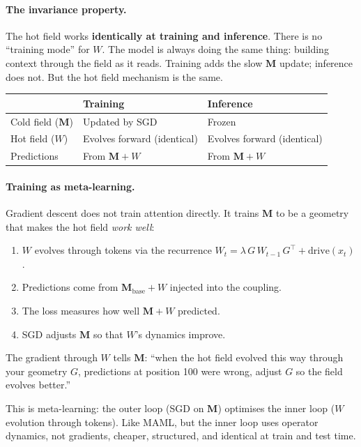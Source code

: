 \documentclass[11pt, a4paper]{article}
\newcommand{\M}{\mathbf{M}}
\theoremstyle{plain}
\theoremstyle{definition}
\theoremstyle{remark}
\begin{document}
\paragraph{The invariance property.}
The hot field works \textbf{identically at training and inference}.
There is no ``training mode'' for $W$.
The model is always doing the same thing: building context through the field as it reads.
Training adds the slow $\M$ update; inference does not.
But the hot field mechanism is the same.

\begin{center}\small
\begin{tabular}{lll}
\toprule
& \textbf{Training} & \textbf{Inference} \\
\midrule
Cold field ($\M$) & Updated by SGD & Frozen \\
Hot field ($W$) & Evolves forward (identical) & Evolves forward (identical) \\
Predictions & From $\M + W$ & From $\M + W$ \\
\bottomrule
\end{tabular}
\end{center}

\paragraph{Training as meta-learning.}
Gradient descent does not train attention directly.
It trains $\M$ to be a geometry that makes the hot field \emph{work well}:
\begin{enumerate}[nosep]
\item $W$ evolves through tokens via the recurrence $W_t = \lambda \, G \, W_{t-1} \, G^\top + \mathrm{drive}(x_t)$.
\item Predictions come from $\M_{\mathrm{base}} + W$ injected into the coupling.
\item The loss measures how well $\M + W$ predicted.
\item SGD adjusts $\M$ so that $W$'s dynamics improve.
\end{enumerate}

The gradient through $W$ tells $\M$: ``when the hot field evolved this way through your geometry $G$, predictions at position 100 were wrong, adjust $G$ so the field evolves better.''

This is meta-learning: the outer loop (SGD on $\M$) optimises the inner loop ($W$ evolution through tokens).
Like MAML, but the inner loop uses operator dynamics, not gradients, cheaper, structured, and identical at train and test time.
\end{document}
